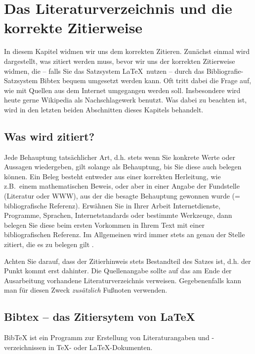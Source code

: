 %
\section{Das Literaturverzeichnis und die korrekte Zitierweise}
\label{sec_literatur}

In diesem Kapitel widmen wir uns dem korrekten Zitieren.
Zunächst einmal wird dargestellt, was zitiert werden muss, bevor wir uns der korrekten Zitierweise widmen, die -- falls Sie das Satzsystem \LaTeX \ nutzen -- durch das Bibliografie-Satzsystem Bibtex bequem umgesetzt werden kann.
Oft tritt dabei die Frage auf, wie mit Quellen aus dem Internet umgegangen werden soll. 
Insbesondere wird heute gerne Wikipedia als Nachschlagewerk benutzt.
Was dabei zu beachten ist, wird in den letzten beiden Abschnitten dieses Kapitels behandelt.

\subsection{Was wird zitiert?}
Jede Behauptung tatsächlicher Art, d.h. stets wenn Sie konkrete Werte oder Aussagen wiedergeben, gilt solange als Behauptung, bis Sie diese auch belegen können.
Ein Beleg besteht entweder aus einer korrekten Herleitung, wie z.B.~einem mathematischen Beweis, oder aber in einer Angabe der Fundstelle (Literatur oder WWW), aus der die besagte Behauptung gewonnen wurde (= bibliografische Referenz). 
Erwähnen Sie in Ihrer Arbeit Internetdienste, Programme, Sprachen, Internetstandards oder bestimmte Werkzeuge, dann belegen Sie diese beim ersten Vorkommen in Ihrem Text mit einer bibliografischen Referenz.
Im Allgemeinen wird immer stets an genau der Stelle zitiert, die es zu belegen gilt \cite{Marchionini}.

\smallskip

Achten Sie darauf, dass der Zitierhinweis stets Bestandteil des Satzes ist, d.h. der Punkt kommt erst dahinter.
Die Quellenangabe sollte auf das am Ende der Ausarbeitung vorhandene Literaturverzeichnis verweisen. 
Gegebenenfalls kann man für diesen Zweck {\em zusätzlich} Fußnoten verwenden.


\subsection{Bibtex -- das Zitiersytem von \LaTeX}

BibTeX ist ein Programm zur Erstellung von Literaturangaben und -verzeichnissen in TeX- oder \LaTeX-Dokumenten.

\smallskip

